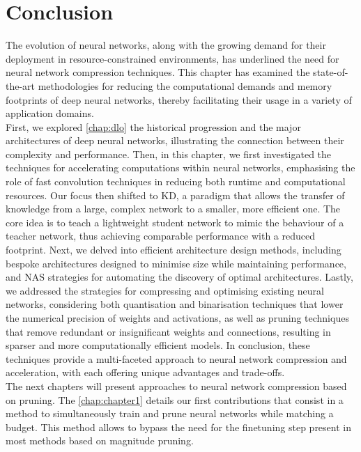 
\section{Conclusion}


The evolution of neural networks, along with the growing demand for their
deployment in resource-constrained environments, has underlined the need for
neural network compression techniques. This chapter has examined the
state-of-the-art methodologies for reducing the computational demands and memory
footprints of deep neural networks, thereby facilitating their usage in a
variety of application domains.\\

First, we explored \cref{chap:dlo} the historical progression and the major
architectures of deep neural networks, illustrating the connection between their
complexity and performance. Then, in this chapter, we first investigated the
techniques for accelerating computations within neural networks, emphasising the
role of fast convolution techniques in reducing both runtime and computational
resources. Our focus then shifted to \acl{KD}, a paradigm that allows the
transfer of knowledge from a large, complex network to a smaller, more efficient
one. The core idea is to teach a lightweight student network to mimic the
behaviour of a teacher network, thus achieving comparable performance with a
reduced footprint. Next, we delved into efficient architecture design methods,
including bespoke architectures designed to minimise size while maintaining
performance, and \acl{NAS} strategies for automating the discovery of optimal
architectures. Lastly, we addressed the strategies for compressing and
optimising existing neural networks, considering both quantisation and
binarisation techniques that lower the numerical precision of weights and
activations, as well as pruning techniques that remove redundant or
insignificant weights and connections, resulting in sparser and more
computationally efficient models. In conclusion, these techniques provide a
multi-faceted approach to neural network compression and acceleration, with each
offering unique advantages and trade-offs.\\

The next chapters will present approaches to neural network compression based on
pruning. The \cref{chap:chapter1} details our first contributions that consist
in a method to simultaneously train and prune neural networks while matching a
budget. This method allows to bypass the need for the finetuning step present in
most methods based on magnitude pruning.